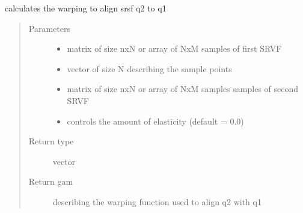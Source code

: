 \documentclass[letterpaper,10pt,english]{sphinxmanual}
\begin{document}
\begin{fulllineitems}
\label{\detokenize{curve_functions:curve_functions.optimum_reparam_curve}}
calculates the warping to align srsf q2 to q1
\begin{quote}\begin{description}
\item[{Parameters}] \leavevmode\begin{itemize}
\item {} 
 \textendash{} matrix of size nxN or array of NxM samples of first SRVF

\item {} 
 \textendash{} vector of size N describing the sample points

\item {} 
 \textendash{} matrix of size nxN or array of NxM samples samples of second SRVF

\item {} 
 \textendash{} controls the amount of elasticity (default = 0.0)

\end{itemize}

\item[{Return type}] \leavevmode
vector

\item[{Return gam}] \leavevmode
describing the warping function used to align q2 with q1

\end{description}\end{quote}

\end{fulllineitems}

\end{document}
